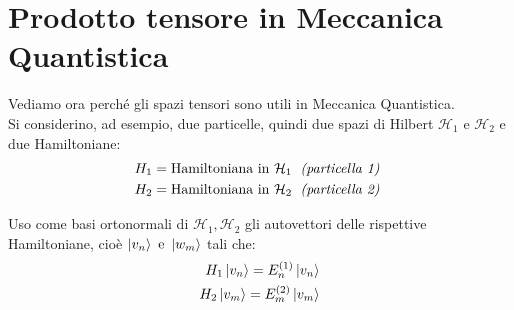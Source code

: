 \section{Prodotto tensore in Meccanica Quantistica} %
Vediamo ora perché gli spazi tensori sono utili in Meccanica Quantistica.\\
Si considerino, ad esempio, due particelle, quindi due spazi di Hilbert $\mathcal{H}_1 \mbox{ e }\mathcal{H}_2$ e due Hamiltoniane:
\begin{equation} \begin{split}
H_1 = \mbox{Hamiltoniana in } \mathcal{H}_1 \mbox{ \;\emph{(particella 1)} } \\
H_2 = \mbox{Hamiltoniana in } \mathcal{H}_2 \mbox{ \;\emph{(particella 2)} }
 \end{split} \end{equation}

Uso come basi ortonormali di $\mathcal{H}_1, \mathcal{H}_2$ gli autovettori delle rispettive Hamiltoniane, cioè $\ket{v_n} \mbox{ e } \ket{w_m} $ tali che:
\begin{equation} \begin{split}
{H}_1 \ket{v_n} = E^{(1)}_n \ket{v_n}\\
{H}_2 \ket{v_m} = E^{(2)}_m \ket{v_m}
 \end{split} \end{equation}

